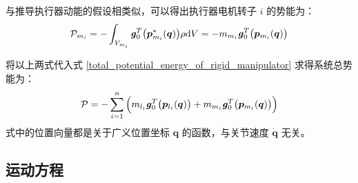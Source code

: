 \documentclass[cn,11pt,chinese,blue,bibstyle=ieeetr]{elegantbook}
\begin{document}
与推导执行器动能的假设相类似，可以得出执行器电机转子 $i$ 的势能为：
\begin{equation}\label{motor_potential_energy_expression}
\mathcal{P}_{m_i} = - \int_{V_{m_i}} {\textbf{\textit{g}}_0^T \big(\bm{p}_{m_i}^* (\bm{q})\big) \rho \mathrm{d}V} = - m_{m_i} \textbf{\textit{g}}_0^T \big(\bm{p}_{m_i} (\bm{q})\big)
\end{equation}

将以上两式代入式 \ref{total_potential_energy_of_rigid_manipulator} 求得系统总势能为：
\begin{equation}\label{total_potential_energy_of_link_and_actuator}
\mathcal{P} = - \sum_{i=1}^{n} \Big( m_{l_i} \textbf{\textit{g}}_0^T \big(\bm{p}_{l_i} (\bm{q})\big) + m_{m_i} \textbf{\textit{g}}_0^T \big(\bm{p}_{m_i} (\bm{q})\big) \Big)
\end{equation}
式中的位置向量都是关于广义位置坐标 $\bm{q}$ 的函数，与关节速度 $\bm{\dot{q}}$ 无关。


\subsection{运动方程}
\end{document}
